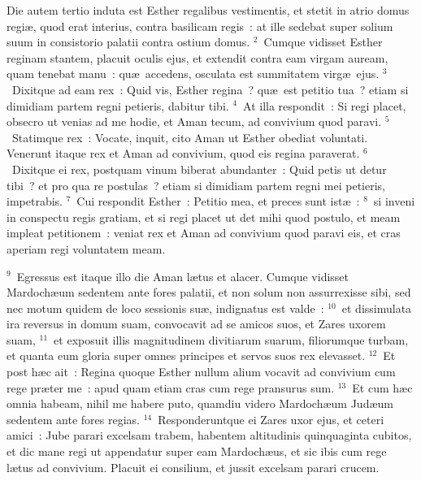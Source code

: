 \lettrine[lines=3,image=true,loversize=0.05,lraise=-0.03]{D}{}ie autem tertio induta est Esther regalibus vestimentis, et stetit in atrio domus regi\ae , quod erat interius, contra basilicam regis~: at ille sedebat super solium suum in consistorio palatii contra ostium domus.
${}^{2}$~Cumque vidisset Esther reginam stantem, placuit oculis ejus, et extendit contra eam virgam auream, quam tenebat manu~: qu\ae\ accedens, osculata est summitatem virg\ae\ ejus.
${}^{3}$~Dixitque ad eam rex~: Quid vis, Esther regina~? qu\ae\ est petitio tua~? etiam si dimidiam partem regni petieris, dabitur tibi.
${}^{4}$~At illa respondit~: Si regi placet, obsecro ut venias ad me hodie, et Aman tecum, ad convivium quod paravi.
${}^{5}$~Statimque rex~: Vocate, inquit, cito Aman ut Esther obediat voluntati. Venerunt itaque rex et Aman ad convivium, quod eis regina paraverat.
${}^{6}$~Dixitque ei rex, postquam vinum biberat abundanter~: Quid petis ut detur tibi~? et pro qua re postulas~? etiam si dimidiam partem regni mei petieris, impetrabis.
${}^{7}$~Cui respondit Esther~: Petitio mea, et preces sunt ist\ae~:
${}^{8}$~si inveni in conspectu regis gratiam, et si regi placet ut det mihi quod postulo, et meam impleat petitionem~: veniat rex et Aman ad convivium quod paravi eis, et cras aperiam regi voluntatem meam.


${}^{9}$~Egressus est itaque illo die Aman l\ae tus et alacer. Cumque vidisset Mardoch\ae um sedentem ante fores palatii, et non solum non assurrexisse sibi, sed nec motum quidem de loco sessionis su\ae , indignatus est valde~:
${}^{10}$~et dissimulata ira reversus in domum suam, convocavit ad se amicos suos, et Zares uxorem suam,
${}^{11}$~et exposuit illis magnitudinem divitiarum suarum, filiorumque turbam, et quanta eum gloria super omnes principes et servos suos rex elevasset.
${}^{12}$~Et post h\ae c ait~: Regina quoque Esther nullum alium vocavit ad convivium cum rege pr\ae ter me~: apud quam etiam cras cum rege pransurus sum.
${}^{13}$~Et cum h\ae c omnia habeam, nihil me habere puto, quamdiu videro Mardoch\ae um Jud\ae um sedentem ante fores regias.
${}^{14}$~Responderuntque ei Zares uxor ejus, et ceteri amici~: Jube parari excelsam trabem, habentem altitudinis quinquaginta cubitos, et dic mane regi ut appendatur super eam Mardoch\ae us, et sic ibis cum rege l\ae tus ad convivium. Placuit ei consilium, et jussit excelsam parari crucem.

